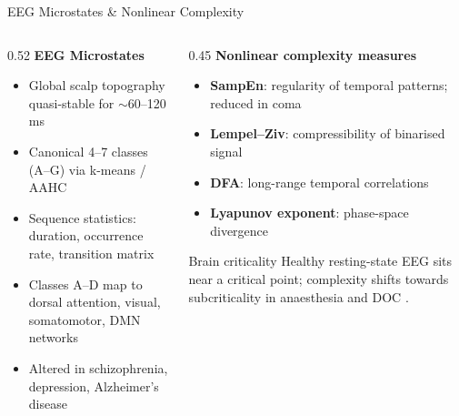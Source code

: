 
\begin{frame}{EEG Microstates \& Nonlinear Complexity}
  \begin{columns}[T]
    \begin{column}{0.52\textwidth}
      \textbf{EEG Microstates}
      \begin{itemize}
        \item Global scalp topography quasi-stable for $\sim$60--120 ms
        \item Canonical 4--7 classes (A--G) via k-means / AAHC \cite{Michel2018}
        \item Sequence statistics: duration, occurrence rate, transition matrix
        \item Classes A--D map to dorsal attention, visual, somatomotor,
          DMN networks \cite{Britz2010}
        \item Altered in schizophrenia, depression, Alzheimer's disease
      \end{itemize}
    \end{column}
    \begin{column}{0.45\textwidth}
      \textbf{Nonlinear complexity measures}
      \begin{itemize}
        \item \textbf{SampEn}: regularity of temporal patterns;
          reduced in coma \cite{Richman2000}
        \item \textbf{Lempel--Ziv}: compressibility of binarised signal
        \item \textbf{DFA}: long-range temporal correlations
        \item \textbf{Lyapunov exponent}: phase-space divergence
      \end{itemize}
      \vspace{0.2em}
      \begin{alertblock}{Brain criticality}
        \small Healthy resting-state EEG sits near a critical point;
        complexity shifts towards subcriticality in anaesthesia
        and DOC \cite{Tagliazucchi2012}.
      \end{alertblock}
    \end{column}
  \end{columns}
\end{frame}
